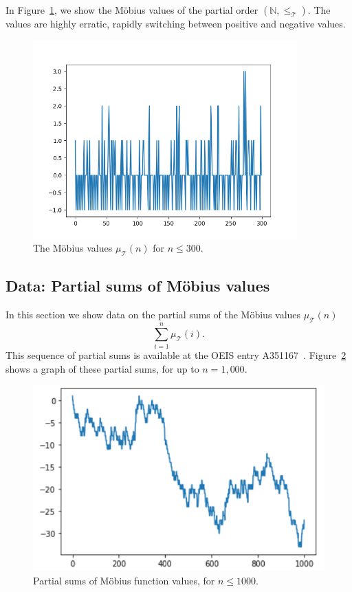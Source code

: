 \documentclass{amsart}
\theoremstyle{definition}
\newcommand{\NN}{\mathbb{N}}
\newcommand{\Mobius}{M\"obius}
\newcommand{\leqtri}{\leq_{\tri}}
\newcommand{\mutri}{\mu_{\tri}}
\newcommand{\tri}{\mathcal T}
\begin{document}
In Figure~\ref{fig:mobius-300}, we show the \Mobius{} values of the partial order $(\NN, \leqtri)$.
The values are highly erratic, rapidly switching between positive and negative values.



\begin{figure}[h!]
    \centering
    \includegraphics[width=4in]{Mobius_Values_Graph.png}
    \vspace{-0.5cm}
    \caption{The \Mobius{} values $\mutri(n)$ for $n \leq 300$.}
    \label{fig:mobius-300}
\end{figure}


\subsection{Data: Partial sums of \Mobius{} values}

In this section we show data on the partial sums of the \Mobius{} values $\mutri(n)$
\[
    \sum_{i = 1}^n \mutri(i).
\]
This sequence of partial sums is available at the OEIS entry A351167~\cite{OEIS-mobius-sums}.
Figure~\ref{fig:mobius-tri-sums} shows a graph of these partial sums, for up to $n = 1,000$.

\begin{figure}[h]
    \centering
    \includegraphics[scale=0.7]{1000_Sum_Function}
    \caption{Partial sums of \Mobius{} function values, for $n \leq 1000$.}
    \label{fig:mobius-tri-sums}
\end{figure}
\end{document}
